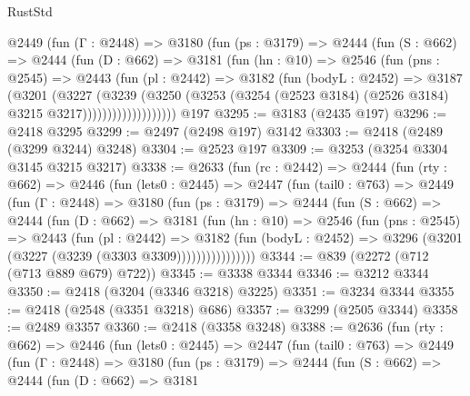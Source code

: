 \begin{lexlean}{RustStd}
\begin{coremodule}
            @2449
              (fun (Γ : @2448) =>
              @3180
                (fun (ps : @3179) =>
                @2444
                  (fun (S : @662) =>
                  @2444
                    (fun (D : @662) =>
                    @3181
                      (fun (hn : @10) =>
                      @2546
                        (fun (pns : @2545) =>
                        @2443
                          (fun (pl : @2442) =>
                          @3182
                            (fun (bodyL : @2452) =>
                            @3187
                              (@3201
                                (@3227
                                  (@3239
                                    (@3250
                                      (@3253
                                        (@3254
                                          (@2523 @3184)
                                          (@2526 @3184)
                                          @3215
                                          @3217)))))))))))))))))))
    @197
@3295 := @3183 (@2435 @197)
@3296 := @2418 @3295
@3299 := @2497 (@2498 @197) @3142
@3303 := @2418 (@2489 (@3299 @3244) @3248)
@3304 := @2523 @197
@3309 := @3253 (@3254 @3304 @3145 @3215 @3217)
@3338 := @2633
    (fun (rc : @2442) =>
    @2444
      (fun (rty : @662) =>
      @2446
        (fun (lets0 : @2445) =>
        @2447
          (fun (tail0 : @763) =>
          @2449
            (fun (Γ : @2448) =>
            @3180
              (fun (ps : @3179) =>
              @2444
                (fun (S : @662) =>
                @2444
                  (fun (D : @662) =>
                  @3181
                    (fun (hn : @10) =>
                    @2546
                      (fun (pns : @2545) =>
                      @2443
                        (fun (pl : @2442) =>
                        @3182
                          (fun (bodyL : @2452) =>
                          @3296 (@3201 (@3227 (@3239 (@3303 @3309))))))))))))))))
@3344 := @839 (@2272 (@712 (@713 @889 @679) @722))
@3345 := @3338 @3344
@3346 := @3212 @3344
@3350 := @2418 (@3204 (@3346 @3218) @3225)
@3351 := @3234 @3344
@3355 := @2418 (@2548 (@3351 @3218) @686)
@3357 := @3299 (@2505 @3344)
@3358 := @2489 @3357
@3360 := @2418 (@3358 @3248)
@3388 := @2636
    (fun (rty : @662) =>
    @2446
      (fun (lets0 : @2445) =>
      @2447
        (fun (tail0 : @763) =>
        @2449
          (fun (Γ : @2448) =>
          @3180
            (fun (ps : @3179) =>
            @2444
              (fun (S : @662) =>
              @2444
                (fun (D : @662) =>
                @3181

\end{coremodule}
\end{lexlean}
